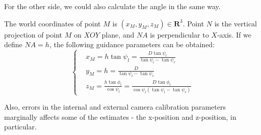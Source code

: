 
For the other side, we could also calculate the angle in the same way.

The world coordinates of point ${M}$ is $(x_M, y_M, z_M)\in \textbf{R}^3 $. Point $N$ is the vertical projection of point $M$ on $XOY$ plane, and $NA$ is perpendicular to $X$-axis. If we define $NA = h$, the following guidance parameters can be obtained:
\begin{equation}
\left \{
\begin{aligned}
&x_M = h \tan \psi_l = \frac{D\tan \psi_l}{\tan \psi_l - \tan \psi_r}            \\
&y_M = h = \frac{D}{\tan \psi_l - \tan \psi_r} \\
&z_M = \frac{h\tan \phi_l}{\cos \psi_l} = \frac{D\tan \phi_l}{\cos \psi_l(\tan \psi_l - \tan \psi_r)}
\end{aligned} \right.
\label{eq:M_Positon_Equation}
\end{equation} 


Also, errors in the internal and external camera calibration parameters marginally affects some of the estimates - the x-position and z-position, in particular.

